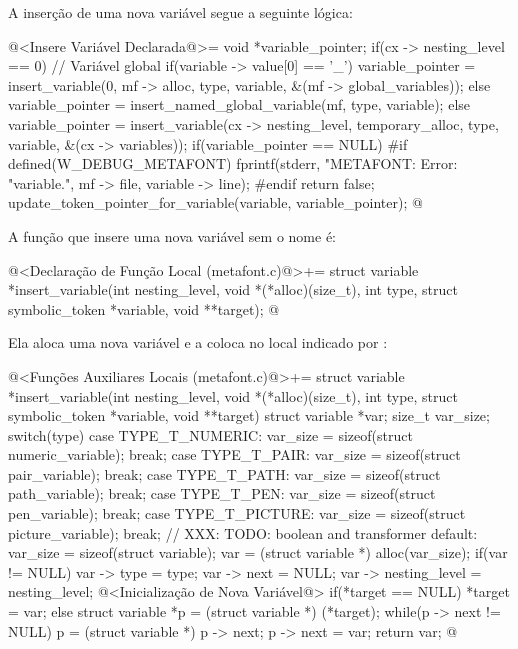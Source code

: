 A inserção de uma nova variável segue a seguinte lógica:

\iniciocodigo
@<Insere Variável Declarada@>=
{
  void *variable_pointer;
  if(cx -> nesting_level == 0){ // Variável global
    if(variable -> value[0] == '_')
      variable_pointer = insert_variable(0, mf -> alloc, type, variable,
                                         &(mf -> global_variables));
    else
      variable_pointer = insert_named_global_variable(mf, type, variable);
  }
  else
    variable_pointer = insert_variable(cx -> nesting_level,
                                      temporary_alloc, type,
                                      variable, &(cx -> variables));
  if(variable_pointer == NULL){
#if defined(W_DEBUG_METAFONT)
      fprintf(stderr, "METAFONT: Error: %
                    "variable.\n", mf -> file, variable -> line);
#endif
    return false;
  }
  update_token_pointer_for_variable(variable, variable_pointer);
}
@
\fimcodigo

A função que insere uma nova variável sem o nome é:

\iniciocodigo
@<Declaração de Função Local (metafont.c)@>+=
struct variable *insert_variable(int nesting_level,
                                 void *(*alloc)(size_t),
                                 int type,
                                 struct symbolic_token *variable,
                                 void **target);
@
\fimcodigo

Ela aloca uma nova variável e a coloca no local indicado
por :

\iniciocodigo
@<Funções Auxiliares Locais (metafont.c)@>+=
struct variable *insert_variable(int nesting_level,
                                 void *(*alloc)(size_t),
                                 int type,
                                 struct symbolic_token *variable,
                                 void **target){
  struct variable *var;
  size_t var_size;
  switch(type){
    case TYPE_T_NUMERIC:
      var_size = sizeof(struct numeric_variable);
      break;
    case TYPE_T_PAIR:
      var_size = sizeof(struct pair_variable);
      break;
    case TYPE_T_PATH:
      var_size = sizeof(struct path_variable);
      break;
    case TYPE_T_PEN:
      var_size = sizeof(struct pen_variable);
      break;
    case TYPE_T_PICTURE:
      var_size = sizeof(struct picture_variable);
      break;
    // XXX: TODO: boolean and transformer
    default:
      var_size = sizeof(struct variable);
  }
  var = (struct variable *) alloc(var_size);
  if(var != NULL){
    var -> type = type;
    var -> next = NULL;
    var -> nesting_level = nesting_level;
    @<Inicialização de Nova Variável@>
  }
  if(*target == NULL)
    *target = var;
  else{
    struct variable *p = (struct variable *) (*target);
    while(p -> next != NULL)
      p = (struct variable *) p -> next;
    p -> next = var;
  }
  return var;
}
@
\fimcodigo

